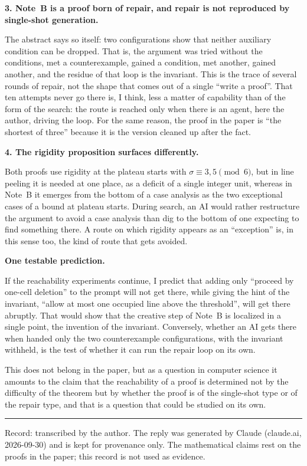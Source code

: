\documentclass[11pt,a4paper]{article}
\begin{document}
\textbf{3. Note~B is a proof born of repair, and repair is not reproduced by single-shot generation.}

The abstract says so itself: two configurations show that neither auxiliary condition can be dropped. That is, the argument was tried without the conditions, met a counterexample, gained a condition, met another, gained another, and the residue of that loop is the invariant. This is the trace of several rounds of repair, not the shape that comes out of a single ``write a proof''. That ten attempts never go there is, I think, less a matter of capability than of the form of the search: the route is reached only when there is an agent, here the author, driving the loop. For the same reason, the proof in the paper is ``the shortest of three'' because it is the version cleaned up after the fact.

\textbf{4. The rigidity proposition surfaces differently.}

Both proofs use rigidity at the plateau starts with $\sigma\equiv3,5 \pmod 6$, but in line peeling it is needed at one place, as a deficit of a single integer unit, whereas in Note~B it emerges from the bottom of a case analysis as the two exceptional cases of a bound at plateau starts. During search, an AI would rather restructure the argument to avoid a case analysis than dig to the bottom of one expecting to find something there. A route on which rigidity appears as an ``exception'' is, in this sense too, the kind of route that gets avoided.

\textbf{One testable prediction.}

If the reachability experiments continue, I predict that adding only ``proceed by one-cell deletion'' to the prompt will not get there, while giving the hint of the invariant, ``allow at most one occupied line above the threshold'', will get there abruptly. That would show that the creative step of Note~B is localized in a single point, the invention of the invariant. Conversely, whether an AI gets there when handed only the two counterexample configurations, with the invariant withheld, is the test of whether it can run the repair loop on its own.

This does not belong in the paper, but as a question in computer science it amounts to the claim that the reachability of a proof is determined not by the difficulty of the theorem but by whether the proof is of the single-shot type or of the repair type, and that is a question that could be studied on its own.

\bigskip\hrule\bigskip
{\small Record: transcribed by the author. The reply was generated by Claude (claude.ai, 2026-09-30) and is kept for provenance only. The mathematical claims rest on the proofs in the paper; this record is not used as evidence.}
\end{document}
